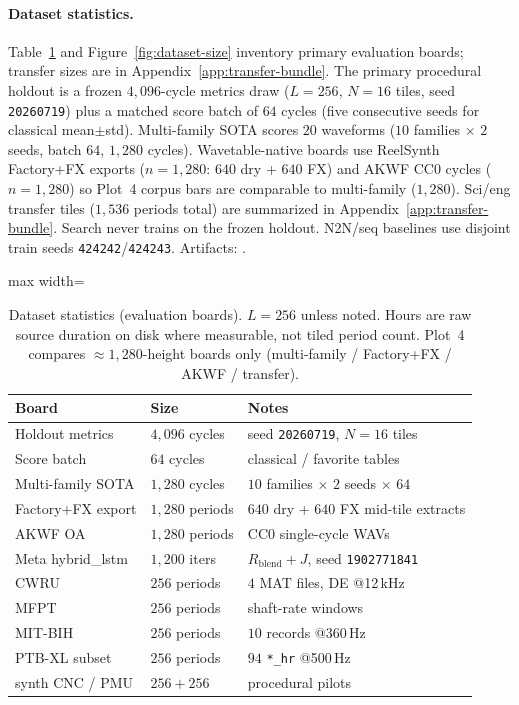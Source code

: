 \paragraph{Dataset statistics.}
Table~\ref{tab:dataset-stats} and Figure~\ref{fig:dataset-size} inventory primary evaluation boards; transfer sizes are in Appendix~\ref{app:transfer-bundle}.
The primary procedural holdout is a frozen $4{,}096$-cycle metrics draw ($L{=}256$, $N{=}16$ tiles, seed \texttt{20260719}) plus a matched score batch of $64$ cycles (five consecutive seeds for classical mean$\pm$std).
Multi-family SOTA scores $20$ waveforms ($10$ families $\times$ $2$ seeds, batch $64$, $1{,}280$ cycles).
Wavetable-native boards use ReelSynth Factory+FX exports ($n{=}1{,}280$: $640$ dry + $640$ FX) and AKWF CC0 cycles ($n{=}1{,}280$) so Plot~4 corpus bars are comparable to multi-family ($1{,}280$).
Sci/eng transfer tiles ($1{,}536$ periods total) are summarized in Appendix~\ref{app:transfer-bundle}.
Search never trains on the frozen holdout. N2N/seq baselines use disjoint train seeds \texttt{424242}/\texttt{424243}.
Artifacts: .

\begin{table}[htbp]
  \centering
  \caption{Dataset statistics (evaluation boards).
    $L{=}256$ unless noted. Hours are raw source duration on disk where measurable, not tiled period count.
    Plot~4 compares ${\approx}1{,}280$-height boards only (multi-family / Factory+FX / AKWF / transfer).}
  \label{tab:dataset-stats}
  \setlength{\tabcolsep}{3pt}
  \begin{adjustbox}{max width=\columnwidth}
\begin{tabular}{@{}llp{}@{}}
    \toprule
    Board & Size & Notes \\
    \midrule
    Holdout metrics & $4{,}096$ cycles & seed \texttt{20260719}, $N{=}16$ tiles \\
    Score batch & $64$ cycles & classical / favorite tables \\
    Multi-family SOTA & $1{,}280$ cycles & $10$ families $\times$ $2$ seeds $\times$ $64$ \\
    Factory+FX export & $1{,}280$ periods & $640$ dry + $640$ FX mid-tile extracts \\
    AKWF OA & $1{,}280$ periods & CC0 single-cycle WAVs \\
    Meta hybrid\_lstm & $1{,}200$ iters & $R_{\mathrm{blend}}{+}J$, seed \texttt{1902771841} \\
    CWRU & $256$ periods & $4$ MAT files, DE @12\,kHz \\
    MFPT & $256$ periods & shaft-rate windows \\
    MIT-BIH & $256$ periods & $10$ records @360\,Hz \\
    PTB-XL subset & $256$ periods & $94$ \texttt{*\_hr} @500\,Hz \\
    synth CNC / PMU & $256{+}256$ & procedural pilots \\
    \bottomrule
  \end{tabular}
\end{adjustbox}
\end{table}


